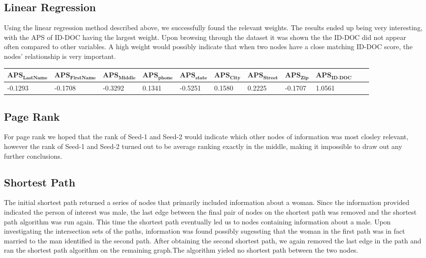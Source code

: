 \documentclass{article} %
\begin{document}
\subsection{Linear Regression}
Using the linear regression method described above, we successfully found the relevant weights. The results ended up being very interesting, with the APS of ID-DOC having the largest weight. Upon browsing through the dataset it was shown the the ID-DOC did not appear often compared to other variables. A high weight would possibly indicate that when two nodes have a close matching ID-DOC score, the nodes' relationship is very important. 
\begin{table}[h]
\centering
\tiny
\begin{tabular}{|l|l|l|l|l|l|l|l|l|l|l|}
\hline

 $\textbf{APS}_{\textbf{LastName}}$ & $\textbf{APS}_{\textbf{FirstName}}$ &  $\textbf{APS}_{\textbf{Middle}}$ &$\textbf{APS}_{\textbf{phone}}$ & $\textbf{APS}_{\textbf{state}}$ & $\textbf{APS}_{\textbf{City}}$ & $\textbf{APS}_{\textbf{Street}}$ & $\textbf{APS}_{\textbf{Zip}}$ & $\textbf{APS}_{\textbf{ID-DOC}}$   \\ \hline

-0.1293 & -0.1708 &  -0.3292 &0.1341 & -0.5251 & 0.1580 &  0.2225 & -0.1707 & 1.0561  \\ \hline
\end{tabular}
\end{table}

\subsection{Page Rank}
For page rank we hoped that the rank of Seed-1 and Seed-2 would indicate which other nodes of information was most closley relevant, however the rank of Seed-1 and Seed-2 turned out to be average ranking exactly in the middle, making it impossible to draw out any further conclusions.

\subsection{Shortest Path}
The initial shortest path returned a series of nodes that primarily included information about a woman. Since the information provided indicated the person of interest was male, the last edge between the final pair of nodes on the shortest path was removed and the shortest path algorithm was run again. This time the shortest path eventually led us to nodes containing information about a male. Upon investigating the intersection sets of the paths, information was found possibly sugessting that the woman in the first path was in fact married to the man identified in the second path. After obtaining the second shortest path, we again removed the last edge in the path and ran the shortest path algorithm on the remaining graph.The algorithm yieled no shortest path between the two nodes. 
\end{document}
